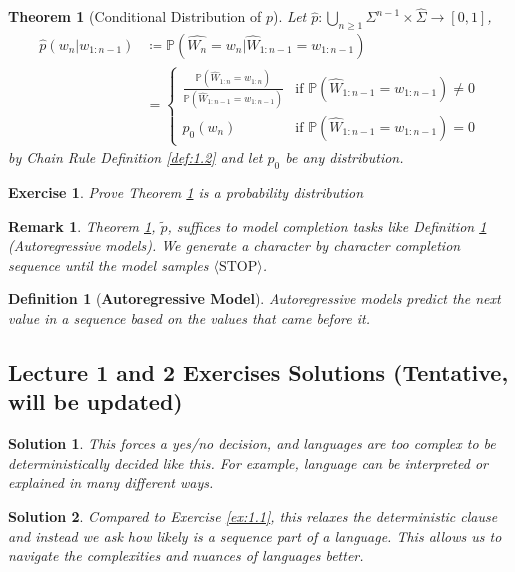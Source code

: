 \documentclass[12pt, twoside]{article}
\theoremstyle{spaceddefn}
\newtheorem{theorem}{Theorem}[section]
\newtheorem{definition}{Definition}[section]
\newtheorem{remark}{Remark}[section]
\newtheorem{exercise}{Exercise}[section]
\newtheorem{soln}{Solution}[section]
\begin{document}
\begin{theorem}[Conditional Distribution of $p$] \label{thm:1.1}
Let $\hat{p}:\bigcup_{n \geq 1}\Sigma^{n-1} \times \hat{\Sigma}\to [0,1]$,
\begin{align*}
\hat{p}(w_n|w_{1:n-1})
  &\coloneqq \mathbb{P}(\hat{W_n}=w_n|\hat{W}_{1:n-1}=w_{1:n-1}) \\
  &= \begin{cases}
       \frac{\mathbb{P}(\hat{W}_{1:n}=w_{1:n})}{\mathbb{P}(\hat{W}_{1:n-1}=w_{1:n-1})} & \text{if } \mathbb{P}(\hat{W}_{1:n-1}=w_{1:n-1}) \neq 0 \\
       p_0(w_n)  & \text{if } \mathbb{P}(\hat{W}_{1:n-1}=w_{1:n-1}) = 0
     \end{cases}
\end{align*}
by Chain Rule Definition \ref{def:1.2} and let $p_0$ be any distribution.


\end{theorem}


\begin{exercise} \label{ex:1.4}
    Prove Theorem \ref{thm:1.1} is a probability distribution
\end{exercise}

\begin{remark}
Theorem \ref{thm:1.1}, $\tilde{p}$, suffices to model completion tasks like Definition \ref{def:1.4} (Autoregressive models). We generate a character by character completion sequence until the model samples $\langle \text{STOP} \rangle$.
\end{remark}

\begin{definition}[\textbf{Autoregressive Model}] \label{def:1.4}
Autoregressive models predict the next value in a sequence based on the values that came before it.
\end{definition}
\newpage

\subsection*{Lecture 1 and 2 Exercises Solutions \small (Tentative, will be updated)}

\begin{soln}
    This forces a yes/no decision, and languages are too complex to be deterministically decided like this. For example, language can be interpreted or explained in many different ways.
\end{soln}

\begin{soln}
    Compared to Exercise \ref{ex:1.1}, this relaxes the deterministic clause and instead we ask how likely is a sequence part of a language. This allows us to navigate the complexities and nuances of languages better.
\end{soln}
\end{document}

